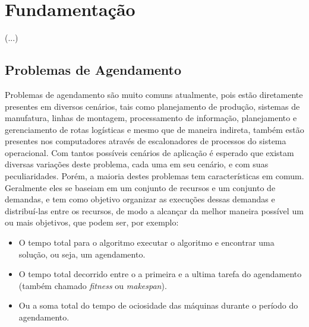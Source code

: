 \chapter{Fundamentação}
(...)

\section{Problemas de Agendamento}
        Problemas de agendamento são muito comuns atualmente, pois estão diretamente presentes em diversos cenários, tais como planejamento de produção, sistemas de manufatura, linhas de montagem, processamento de informação, planejamento e gerenciamento de rotas logísticas e mesmo que de maneira indireta, também estão presentes nos computadores através de escalonadores de processos do sistema operacional.
        Com tantos possíveis cenários de aplicação é esperado que existam diversas variações deste problema, cada uma em seu cenário, e com suas peculiaridades. Porém, a maioria destes problemas tem características em comum. Geralmente eles se baseiam em um conjunto de recursos e um conjunto de demandas, e tem como objetivo organizar as execuções dessas demandas e distribuí-las entre os recursos, de modo a alcançar da melhor maneira possível um ou mais objetivos, que podem ser, por exemplo: 
        \begin{itemize}
            \item O tempo total para o algoritmo executar o algoritmo e encontrar uma solução, ou seja, um agendamento.
            \item O tempo total decorrido entre o a primeira e a ultima tarefa do agendamento (também chamado \textit{fitness} ou \textit{makespan}).
            \item Ou a soma total do tempo de ociosidade das máquinas durante o período do agendamento.\\
        \end{itemize}
        

